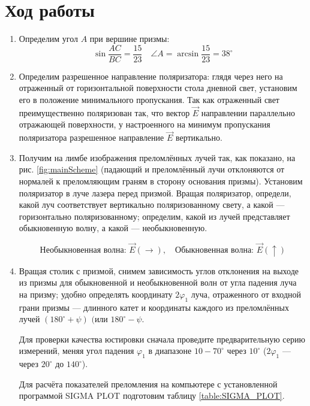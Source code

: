 \documentclass[a4paper, 12pt]{article}
\begin{document}
	\section{Ход работы}
	\begin{enumerate}
		\item Определим угол $A$ при вершине призмы:
		\begin{equation*}
			\sin\frac{AC}{BC}=\frac{15}{23}\quad\angle A=\arcsin\frac{15}{23}=38^\circ
		\end{equation*}
		\item Определим разрешенное направление поляризатора: глядя через него на отраженный от горизонтальной поверхности стола дневной свет, установим его в положение минимального пропускания. Так как отраженный свет преимущественно поляризован так, что вектор $\vec{E}$ направлении параллельно отражающей поверхности, у настроенного на минимум пропускания поляризатора разрешенное направление $\vec{E}$ вертикально.
		\item Получим на лимбе изображения преломлённых лучей так, как показано, на рис. \ref{fig:mainScheme} (падающий и преломлённый лучи отклоняются от нормалей к преломляющим граням в сторону основания призмы). Установим поляризатор в луче лазера перед призмой. Вращая поляризатор, определи, какой луч соответствует вертикально поляризованному свету, а какой — горизонтально поляризованному; определим, какой из лучей представляет обыкновенную волну, а какой — необыкновенную.\par
		\begin{equation*}
			\text{Необыкновенная волна: }\vec{E} (\rightarrow),\quad\text{Обыкновенная волна: }\vec{E}(\uparrow)
		\end{equation*}
		\item Вращая столик с призмой, снимем зависимость углов отклонения на выходе из призмы для обыкновенной и необыкновенной волн от угла падения луча на призму; удобно определять координату $2\varphi_1$ луча, отраженного от входной грани призмы — длинного катет и координаты каждого из преломлённых лучей $(180^\circ+\psi)$ $(\text{или }180^\circ-\psi$.\par
		 Для проверки качества юстировки сначала проведите предварительную серию измерений, меняя угол падения $\varphi_1$ в диапазоне $10-70^\circ$ через $10^\circ$ ($2\varphi_1$ — через $20^\circ$ до $140^\circ$).\par
		 Для расчёта показателей преломления на компьютере с установленной программой SIGMA PLOT подготовим таблицу \ref{table:SIGMA_PLOT}.
		 \begin{table}

\end{table}
\end{enumerate}
\end{document}
